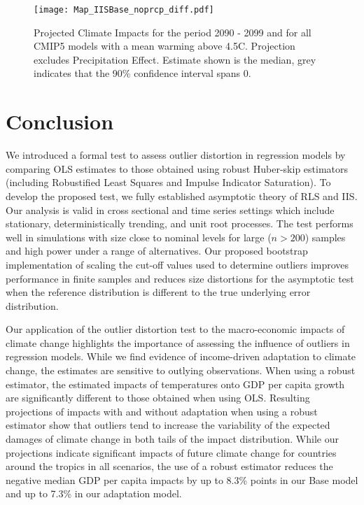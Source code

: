 \documentclass[11pt, letterpaper]{article}
\numberwithin{algorithm}{section}
\numberwithin{assumption}{section}
\numberwithin{lemma}{section}
\numberwithin{theorem}{section}
\numberwithin{corollary}{section}
\numberwithin{remark}{section}
\numberwithin{equation}{section}
\numberwithin{figure}{section}
\numberwithin{table}{section}
\begin{document}
\begin{figure}[!htbp]  \vspace{-.35in}
\centering
\texttt{[image: Map\_IISBase\_noprcp\_diff.pdf]}
\caption{Projected Climate Impacts for the period 2090 - 2099 and for all CMIP5 models with a mean warming above 4.5\textdegree C. Projection excludes Precipitation Effect. Estimate shown is the median, grey indicates that the 90\% confidence interval spans 0.}
\label{fig_projection_map}
\end{figure}






\clearpage
\section{Conclusion}
We introduced a formal test to assess outlier distortion in regression models by comparing OLS estimates to those obtained using robust Huber-skip estimators (including Robustified Least Squares and Impulse Indicator Saturation). To develop the proposed test, we fully established asymptotic theory of RLS and IIS. Our analysis is valid in cross sectional and time series settings which include stationary, deterministically trending, and unit root processes. The test performs well in simulations with size close to nominal levels for large ($n>200$) samples and high power under a range of alternatives. Our proposed bootstrap implementation of scaling the cut-off values used to determine outliers improves performance in finite samples and reduces size distortions for the asymptotic test when the reference distribution is different to the true underlying error distribution.

Our application of the outlier distortion test to the macro-economic impacts of climate change highlights the importance of assessing the influence of outliers in regression models. While we find evidence of income-driven adaptation to climate change, the estimates are sensitive to outlying observations.
When using a robust estimator, the estimated impacts of temperatures onto GDP per capita growth are significantly different to those obtained when using OLS. Resulting projections of impacts with and without adaptation when using a robust estimator show that outliers tend to increase the variability of the expected damages of climate change in both tails of the impact distribution. While our projections indicate significant impacts of future climate change for countries around the tropics in all scenarios, the use of a robust estimator reduces the negative median GDP per capita impacts by up to 8.3\% points in our Base model and up to 7.3\% in our adaptation model.
\end{document}
